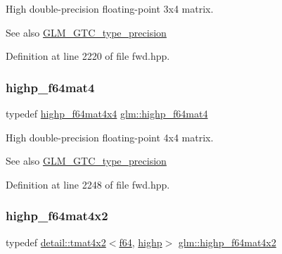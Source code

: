 High double-\/precision floating-\/point 3x4 matrix. \begin{DoxySeeAlso}{See also}
\hyperlink{group__gtc__type__precision}{G\+L\+M\+\_\+\+G\+T\+C\+\_\+type\+\_\+precision} 
\end{DoxySeeAlso}


Definition at line 2220 of file fwd.\+hpp.

\mbox{\label{group__gtc__type__precision_ga1ac5d0564721a22765c68c54a0a4f87a}} 
\subsubsection{\texorpdfstring{highp\+\_\+f64mat4}{highp\_f64mat4}}
{\footnotesize\ttfamily typedef \hyperlink{group__gtc__type__precision_gaa95b52552df369b75d09155ebb29b1bd}{highp\+\_\+f64mat4x4} \hyperlink{group__gtc__type__precision_ga1ac5d0564721a22765c68c54a0a4f87a}{glm\+::highp\+\_\+f64mat4}}

High double-\/precision floating-\/point 4x4 matrix. \begin{DoxySeeAlso}{See also}
\hyperlink{group__gtc__type__precision}{G\+L\+M\+\_\+\+G\+T\+C\+\_\+type\+\_\+precision} 
\end{DoxySeeAlso}


Definition at line 2248 of file fwd.\+hpp.

\mbox{\label{group__gtc__type__precision_gabe9bc3680e7d83a7b34297da518a8117}} 
\subsubsection{\texorpdfstring{highp\+\_\+f64mat4x2}{highp\_f64mat4x2}}
{\footnotesize\ttfamily typedef \hyperlink{structglm_1_1detail_1_1tmat4x2}{detail\+::tmat4x2}$<$\hyperlink{group__gtc__type__precision_ga2bba392e555124b36cde6abba349bab3}{f64}, \hyperlink{namespaceglm_a0f04f086094c747d227af4425893f545ac6f7eab42eacbb10d59a58e95e362074}{highp}$>$ \hyperlink{group__gtc__type__precision_gabe9bc3680e7d83a7b34297da518a8117}{glm\+::highp\+\_\+f64mat4x2}}

